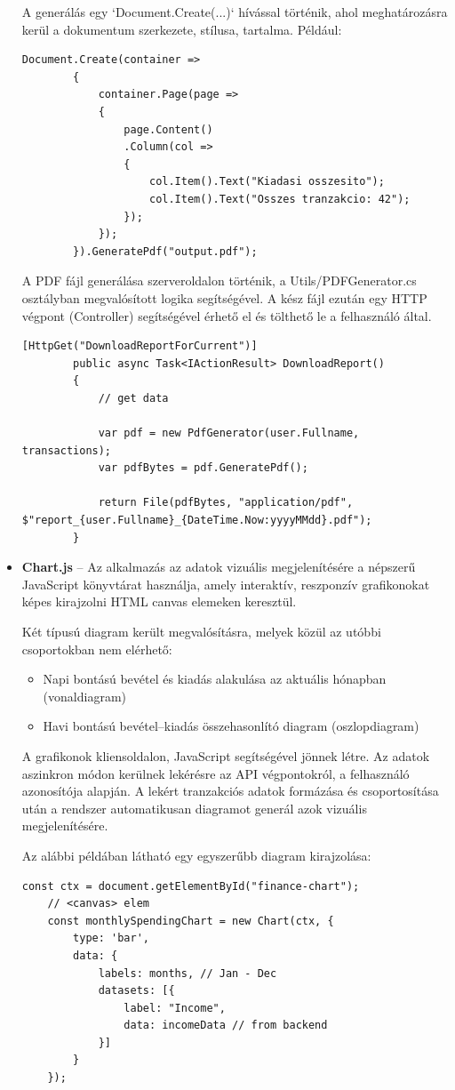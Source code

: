 \begin{itemize}
A generálás egy `Document.Create(...)` hívással történik, ahol meghatározásra kerül a dokumentum szerkezete, stílusa, tartalma. Például:
	
	\begin{lstlisting}[language={[Sharp]C}]
		Document.Create(container =>
		{
			container.Page(page =>
			{
				page.Content()
				.Column(col =>
				{
					col.Item().Text("Kiadasi osszesito");
					col.Item().Text("Osszes tranzakcio: 42");
				});
			});
		}).GeneratePdf("output.pdf");
	\end{lstlisting}
	
	A PDF fájl generálása szerveroldalon történik, a Utils/PDFGenerator.cs osztályban megvalósított logika segítségével. A kész fájl ezután egy HTTP végpont (Controller) segítségével érhető el és tölthető le a felhasználó által.
	
	\begin{lstlisting}[language={[Sharp]C}]
		[HttpGet("DownloadReportForCurrent")]
		public async Task<IActionResult> DownloadReport()
		{
			// get data
			
			var pdf = new PdfGenerator(user.Fullname, transactions);
			var pdfBytes = pdf.GeneratePdf();
			
			return File(pdfBytes, "application/pdf", $"report_{user.Fullname}_{DateTime.Now:yyyyMMdd}.pdf");
		}
	\end{lstlisting}
	\item \textbf{Chart.js} – Az alkalmazás az adatok vizuális megjelenítésére a népszerű JavaScript könyvtárat használja, amely interaktív, reszponzív grafikonokat képes kirajzolni HTML canvas elemeken keresztül.
	
	Két típusú diagram került megvalósításra, melyek közül az utóbbi csoportokban nem elérhető:
	\begin{itemize}
		\item Napi bontású bevétel és kiadás alakulása az aktuális hónapban (vonaldiagram)
		\item Havi bontású bevétel–kiadás összehasonlító diagram (oszlopdiagram)
	\end{itemize}
	
	A grafikonok kliensoldalon, JavaScript segítségével jönnek létre. Az adatok aszinkron módon kerülnek lekérésre az API végpontokról, a felhasználó azonosítója alapján. A lekért tranzakciós adatok formázása és csoportosítása után a rendszer automatikusan diagramot generál azok vizuális megjelenítésére.
	
	Az alábbi példában látható egy egyszerűbb diagram kirajzolása:
	
	\begin{lstlisting}[language={[Sharp]C}]
 	const ctx = document.getElementById("finance-chart");
 	// <canvas> elem
 	const monthlySpendingChart = new Chart(ctx, {
 		type: 'bar',
 		data: {
 			labels: months, // Jan - Dec
 			datasets: [{
 				label: "Income",
 				data: incomeData // from backend
 			}]
 		}
 	});
	\end{lstlisting}
\end{itemize}

